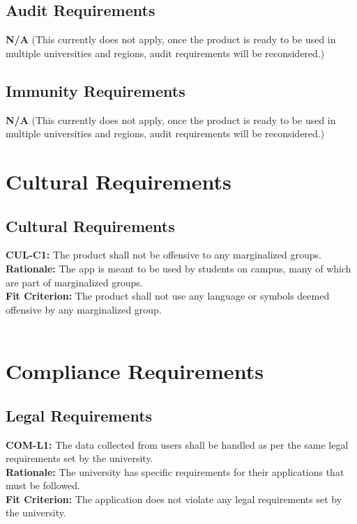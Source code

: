 \documentclass[12pt]{article}
\begin{document}
\subsection{Audit Requirements}
  \textbf{N/A} (This currently does not apply, once the product is ready to be used in multiple universities and regions, audit requirements will be reconsidered.)\\

\subsection{Immunity Requirements}
  \textbf{N/A} (This currently does not apply, once the product is ready to be used in multiple universities and regions, audit requirements will be reconsidered.)\\

\section{Cultural Requirements}
\subsection{Cultural Requirements}
  \textbf{CUL-C1:} The product shall not be offensive to any marginalized groups.\\
  \textbf{Rationale:} The app is meant to be used by students on campus, many of which are part of marginalized groups.\\
  \textbf{Fit Criterion:} The product shall not use any language or symbols deemed offensive by any marginalized group.\\\\

\section{Compliance Requirements}
\subsection{Legal Requirements}
  \textbf{COM-L1:} The data collected from users shall be handled as per the same legal requirements set by the university.\\
  \textbf{Rationale:} The university has specific requirements for their applications that must be followed.\\
  \textbf{Fit Criterion:} The application does not violate any legal requirements set by the university.\\\\
\end{document}
